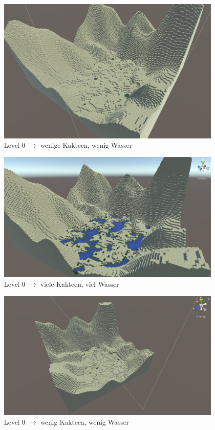 \documentclass{article}
\begin{document}
\begin{center}
\begin{figure}
\includegraphics[width=\textwidth]{level0_1.png}
\caption{Level 0 $\rightarrow$ wenige Kakteen, wenig Wasser}
\end{figure}
\begin{figure}
\includegraphics[width=\textwidth]{level59_1.png}
\caption{Level 0 $\rightarrow$ viele Kakteen, viel Wasser}
\end{figure}
\begin{figure}
\includegraphics[width=\textwidth]{level0.png}
\caption{Level 0 $\rightarrow$ wenig Kakteen, wenig Wasser}
\end{figure}
\end{center}
\end{document}

